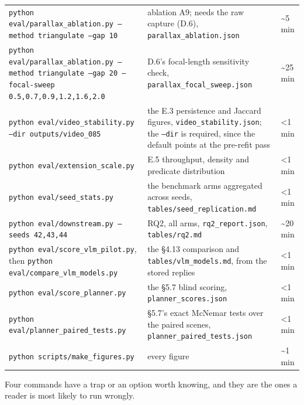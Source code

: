 \begin{center}
\begin{longtable}{>{\raggedright\arraybackslash}p{}>{\raggedright\arraybackslash}p{}>{\raggedright\arraybackslash}p{}}
\texttt{python eval/parallax\_\allowbreak{}ablation.py --method triangulate --gap 10} & ablation A9; needs the raw capture (D.6), \texttt{parallax\_\allowbreak{}ablation.json} & \textasciitilde{}5 min \\
\texttt{python eval/parallax\_\allowbreak{}ablation.py --method triangulate --gap 20 --focal-sweep 0.5,0.7,0.9,1.2,1.6,2.0} & D.6's focal-length sensitivity check, \texttt{parallax\_\allowbreak{}focal\_\allowbreak{}sweep.json} & \textasciitilde{}25 min \\
\texttt{python eval/video\_\allowbreak{}stability.py --dir outputs/video\_\allowbreak{}085} & the E.3 persistence and Jaccard figures, \texttt{video\_\allowbreak{}stability.json}; the \texttt{--dir} is required, since the default points at the pre-refit pass & <1 min \\
\texttt{python eval/extension\_\allowbreak{}scale.py} & E.5 throughput, density and predicate distribution & <1 min \\
\texttt{python eval/seed\_\allowbreak{}stats.py} & the benchmark arms aggregated across seeds, \texttt{tables/seed\_\allowbreak{}replication.md} & <1 min \\
\texttt{python eval/downstream.py --seeds 42,43,44} & RQ2, all arms, \texttt{rq2\_\allowbreak{}report.json}, \texttt{tables/rq2.md} & \textasciitilde{}20 min \\
\texttt{python eval/score\_\allowbreak{}vlm\_\allowbreak{}pilot.py}, then \texttt{python eval/compare\_\allowbreak{}vlm\_\allowbreak{}models.py} & the \S{}4.13 comparison and \texttt{tables/vlm\_\allowbreak{}models.md}, from the stored replies & <1 min \\
\texttt{python eval/score\_\allowbreak{}planner.py} & the \S{}5.7 blind scoring, \texttt{planner\_\allowbreak{}scores.json} & <1 min \\
\texttt{python eval/planner\_\allowbreak{}paired\_\allowbreak{}tests.py} & \S{}5.7's exact McNemar tests over the paired scenes, \texttt{planner\_\allowbreak{}paired\_\allowbreak{}tests.json} & <1 min \\
\texttt{python scripts/make\_\allowbreak{}figures.py} & every figure & \textasciitilde{}1 min \\
\hline
\end{longtable}
\end{center}

Four commands have a trap or an option worth knowing, and they are the ones a reader is most likely to run wrongly.

